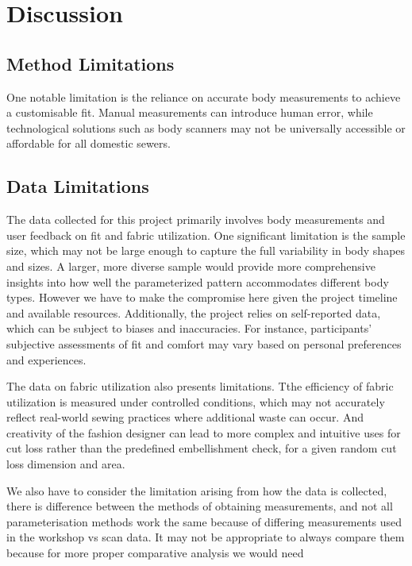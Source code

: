 \chapter{Discussion}


\section{Method Limitations}

One notable limitation is the reliance on accurate body measurements to achieve a customisable fit. Manual measurements can introduce human error, while technological solutions such as body scanners may not be universally accessible or affordable for all domestic sewers.

\section{Data Limitations}
The data collected for this project primarily involves body measurements and user feedback on fit and fabric utilization. One significant limitation is the sample size, which may not be large enough to capture the full variability in body shapes and sizes. A larger, more diverse sample would provide more comprehensive insights into how well the parameterized pattern accommodates different body types. However we have to make the compromise here given the project timeline and available resources. Additionally, the project relies on self-reported data, which can be subject to biases and inaccuracies. For instance, participants’ subjective assessments of fit and comfort may vary based on personal preferences and experiences. 

The data on fabric utilization also presents limitations. Tthe efficiency of fabric utilization is measured under controlled conditions, which may not accurately reflect real-world sewing practices where additional waste can occur. And creativity of the fashion designer can lead to more complex and intuitive uses for cut loss rather than the predefined embellishment check, for a given random cut loss dimension and area.

We also have to consider the limitation arising from how the data is collected, there is difference between the methods of obtaining measurements, and not all parameterisation methods work the same because of differing measurements used in the workshop vs scan data. It may not be appropriate to always compare them because for more proper comparative analysis we would need 


